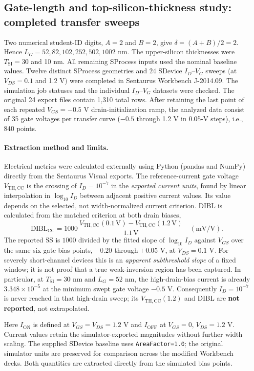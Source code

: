 \subsection{Gate-length and top-silicon-thickness study: completed transfer sweeps}
Two numerical student-ID digits, $A=2$ and $B=2$, give $\delta=(A+B)/2=2$. Hence
$L_G=52,82,102,252,502,1002$ nm. The upper-silicon thicknesses were
$T_{\mathrm{SI}}=30$ and 10 nm. All remaining SProcess inputs used the
nominal baseline values. Twelve distinct SProcess geometries and 24
SDevice $I_D$--$V_G$ sweeps (at $V_{DS}=0.1$ and 1.2 V) were completed
in Sentaurus Workbench J-2014.09. The simulation job statuses and
the individual $I_D$--$V_G$ datasets were checked.
The original 24 export files contain 1,310 total rows. After retaining
the last point of each repeated $V_{GS}=-0.5$ V drain-initialization
ramp, the analyzed data consist of 35 gate voltages per transfer
curve ($-0.5$ through 1.2 V in 0.05-V steps), i.e., 840 points.

\paragraph{Extraction method and limits.}
Electrical metrics were calculated externally using Python (pandas
and NumPy) directly from the Sentaurus Visual exports.
The reference-current gate voltage $V_{\mathrm{TH,CC}}$ is the crossing
of $I_D=10^{-7}$ in the \emph{exported current units}, found by
linear interpolation in $\log_{10} I_D$ between adjacent positive
current values. Its value depends on the selected, not
width-normalized current criterion. DIBL is calculated from the
matched criterion at both drain biases,
\[
\mathrm{DIBL}_{\mathrm{CC}}=
1000\,\frac{V_{\mathrm{TH,CC}}(0.1\mathrm{\,V})-
V_{\mathrm{TH,CC}}(1.2\mathrm{\,V})}{1.1\mathrm{\,V}}
\quad(\mathrm{mV/V}).
\]
The reported SS is $1000$ divided by the fitted slope of
$\log_{10}I_D$ against $V_{GS}$ over the same six gate-bias points,
$-0.20$ through $+0.05$ V, at $V_{DS}=0.1$ V.
For severely short-channel devices this is an \emph{apparent
subthreshold slope} of a fixed window; it is not proof that a true
weak-inversion region has been captured. In particular, at
$T_{\mathrm{SI}}=30$ nm and $L_G=52$ nm, the high-drain-bias current
is already $3.348\times10^{-5}$ at the minimum swept gate voltage
$-0.5$ V. Consequently $I_D=10^{-7}$ is never reached in that
high-drain sweep; its $V_{\mathrm{TH,CC}}(1.2)$ and DIBL are
\textbf{not reported}, not extrapolated.

Here $I_{\mathrm{ON}}$ is defined at $V_{GS}=V_{DS}=1.2$ V and
$I_{\mathrm{OFF}}$ at $V_{GS}=0$, $V_{DS}=1.2$ V.
Current values retain the simulator-exported magnitudes without
further width scaling. The supplied SDevice baseline uses
\texttt{AreaFactor=1.0}; the original simulator units are
preserved for comparison across the modified Workbench decks.
Both quantities are extracted directly from the simulated
bias points.

